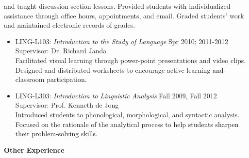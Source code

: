 \begin{singlespace}
\vspace{6pt}
 and taught discussion-section lessons. Provided students with individualized assistance through office hours, appointments, and email. Graded students' work and maintained electronic records of grades.
\vspace{3pt}
\begin{itemize} \itemsep6pt
\item{LING-L103:} \textit{Introduction to the Study of Language} \hfill Spr 2010; 2011-2012 \\
Supervisor: Dr. Richard Janda \\
\noindent Facilitated visual learning through power-point presentations and video clips. Designed and distributed worksheets to encourage active learning and classroom participation.
\item LING-L303: \textit{Introduction to Linguistic Analysis}
\hfill Fall 2009, Fall 2012 \\
Supervisor: Prof. Kenneth de Jong \\
Introduced students to phonological, morphological, and syntactic analysis. Focused on the rationale of the analytical process to help students sharpen their problem-solving skills.
\end{itemize}
\vspace{20pt}
\centerline{\textbf{\Large Other Experience}}

\end{singlespace}
